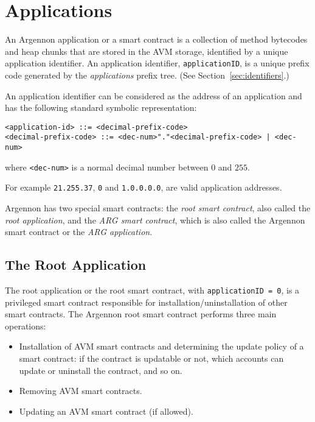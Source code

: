 
\section{Applications}\label{sec:applications}

An Argennon application or a smart contract is a collection of method bytecodes and heap chunks that are stored in
the AVM storage, identified by a unique application identifier. An application identifier, \texttt{applicationID}, is
a unique prefix code generated by the \emph{applications} prefix tree. (See Section~\ref{sec:identifiers}.)

An application identifier can
be considered as the address of an application and has the following standard symbolic representation:
\begin{verbatim}
<application-id> ::= <decimal-prefix-code>
<decimal-prefix-code> ::= <dec-num>"."<decimal-prefix-code> | <dec-num>
\end{verbatim}
where \texttt{<dec-num>} is a normal decimal number between $0$ and $255$.

For example \texttt{21.255.37}, \texttt{0} and \texttt{1.0.0.0.0}, are valid application addresses.

Argennon has two special smart contracts: the \emph{root smart contract}, also called the \emph{root application}, and
the \emph{ARG smart contract}, which is also called the Argennon smart contract or the \emph{ARG application}.

\subsection{The Root Application}\label{subsec:the-root-app}

The root application or the root smart contract, with \texttt{applicationID = 0}, is a privileged smart contract
responsible for installation/uninstallation of other smart contracts. The Argennon root smart contract
performs three main operations:

\begin{itemize}
    \item Installation of AVM smart contracts and determining the update policy of a smart
    contract: if the contract is updatable or not, which accounts can update or uninstall the contract, and so
    on.
    \item Removing AVM smart contracts.
    \item Updating an AVM smart contract (if allowed).
\end{itemize}

